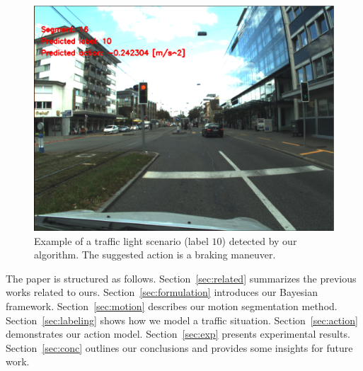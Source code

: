 \begin{figure}[t]
\centering
\includegraphics[scale=0.134]{fig/finalResult.eps}
\caption{Example of a traffic light scenario (label $10$) detected by our
algorithm. The suggested action is a braking maneuver.\vspace{-100mm}}
\label{fig:final}
\end{figure}

The paper is structured as follows. Section~\ref{sec:related}
summarizes the previous works related to ours. Section~\ref{sec:formulation}
introduces our Bayesian framework. Section~\ref{sec:motion} describes our motion
segmentation method. Section~\ref{sec:labeling} shows how we model a traffic
situation. Section~\ref{sec:action} demonstrates our action model.
Section~\ref{sec:exp} presents experimental results. Section~\ref{sec:conc}
outlines our conclusions and provides some insights for future work.
